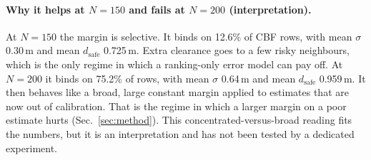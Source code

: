 \documentclass{article}
\newcommand{\dsafe}{d_{\mathrm{safe}}}
\begin{document}
\paragraph{Why it helps at $N=150$ and fails at $N=200$ (interpretation).}
At $N=150$ the margin is selective. It binds on 12.6\% of CBF rows, with mean $\sigma$ 0.30\,m and
mean $\dsafe$ 0.725\,m. Extra clearance goes to a few risky neighbours, which is the only regime in
which a ranking-only error model can pay off. At $N=200$ it binds on 75.2\% of rows, with mean
$\sigma$ 0.64\,m and mean $\dsafe$ 0.959\,m. It then behaves like a broad, large constant margin
applied to estimates that are now out of calibration. That is the regime in which a larger margin
on a poor estimate hurts (Sec.~\ref{sec:method}).
This concentrated-versus-broad reading fits the numbers, but it is an interpretation and has not
been tested by a dedicated experiment.

\end{document}
